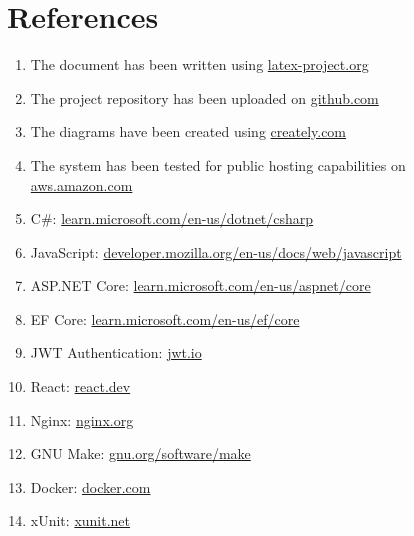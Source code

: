 \chapter{References}

\begin{enumerate}
    \item The document has been written using \url{latex-project.org}
    \item The project repository has been uploaded on \url{github.com}
    \item The diagrams have been created using \url{creately.com}
    \item The system has been tested for public hosting capabilities on \url{aws.amazon.com}
    \item C\#: \url{learn.microsoft.com/en-us/dotnet/csharp}
    \item JavaScript: \url{developer.mozilla.org/en-us/docs/web/javascript}
    \item ASP.NET Core: \url{learn.microsoft.com/en-us/aspnet/core}
    \item EF Core: \url{learn.microsoft.com/en-us/ef/core}
    \item JWT Authentication: \url{jwt.io}
    \item React: \url{react.dev}
    \item Nginx: \url{nginx.org}
    \item GNU Make: \url{gnu.org/software/make}
    \item Docker: \url{docker.com}
    \item xUnit: \url{xunit.net}
\end{enumerate}

